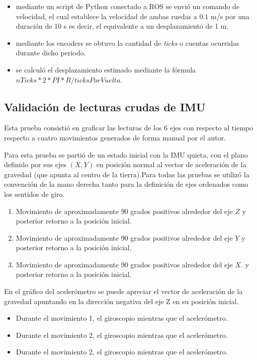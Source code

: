 \begin{itemize}
    \item mediante un script de Python conectado a ROS se envió un comando de velocidad, el cual establece la velocidad de ambas ruedas a 0.1 m/s por una duración de 10 s es decir, el equivalente a un desplazamiento de 1 m.
    \item mediante los encoders se obtuvo la cantidad de \textit{ticks} o cuentas ocurridas durante dicho periodo.
    \item se calculó el desplazamiento estimado mediante la fórmula $nTicks * 2 * PI * R / ticksPorVuelta$.
\end{itemize}

\subsection{Validación de lecturas crudas de IMU}

Esta prueba consistió en graficar las lecturas de los 6 ejes con respecto al tiempo respecto a cuatro movimientos generados de forma manual por el autor.

Para esta prueba se partió de un estado inicial con la IMU quieta, con el plano definido por sus ejes $(X,Y)$ en posición normal al vector de aceleración de la gravedad (que apunta al centro de la tierra).Para todas las pruebas se utilizó la convención de la mano derecha tanto para la definición de ejes ordenados como los sentidos de giro.

\begin{enumerate}
    \item Movimiento de aproximadamente 90 grados positivos alrededor del eje $Z$ y posterior retorno a la posición inicial.
    \item Movimiento de aproximadamente 90 grados positivos alrededor del eje $Y$ y posterior retorno a la posición inicial.
    \item Movimiento de aproximadamente 90 grados positivos alrededor del eje $X$. y posterior retorno a la posición inicial.
\end{enumerate}

En el gráfico del acelerómetro se puede apreciar el vector de aceleración de la gravedad apuntando en la dirección negativa del eje Z en su posición inicial.
\begin{itemize}
    \item Durante el movimiento 1, el giroscopio mientras que el acelerómetro.
    \item Durante el movimiento 2, el giroscopio mientras que el acelerómetro.
    \item Durante el movimiento 2, el giroscopio mientras que el acelerómetro.
\end{itemize}

